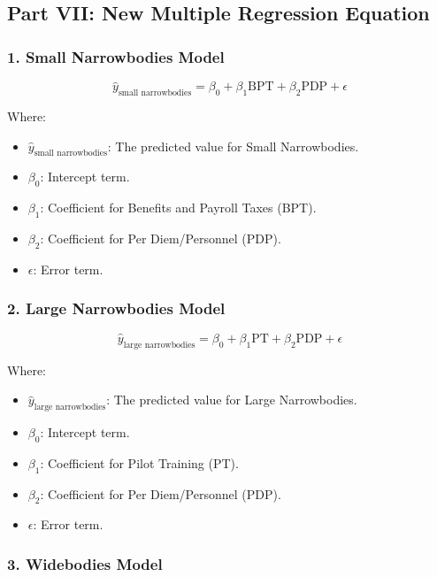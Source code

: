 \subsection{Part VII: New Multiple Regression Equation}
\subsubsection*{1. Small Narrowbodies Model}

\begin{equation}
    \hat{y}_{\text{small narrowbodies}} = \beta_0 + \beta_1 \text{BPT} + \beta_2 \text{PDP} + \epsilon
\end{equation}

Where:
\begin{itemize}
    \item \(\hat{y}_{\text{small narrowbodies}}\): The predicted value for Small Narrowbodies.
    \item \(\beta_0\): Intercept term.
    \item \(\beta_1\): Coefficient for Benefits and Payroll Taxes (BPT).
    \item \(\beta_2\): Coefficient for Per Diem/Personnel (PDP).
    \item \(\epsilon\): Error term.
\end{itemize}

\subsubsection{2. Large Narrowbodies Model}



\begin{equation}
    \hat{y}_{\text{large narrowbodies}} = \beta_0 + \beta_1 \text{PT} + \beta_2 \text{PDP} + \epsilon
\end{equation}

Where:
\begin{itemize}
    \item \(\hat{y}_{\text{large narrowbodies}}\): The predicted value for Large Narrowbodies.
    \item \(\beta_0\): Intercept term.
    \item \(\beta_1\): Coefficient for Pilot Training (PT).
    \item \(\beta_2\): Coefficient for Per Diem/Personnel (PDP).
    \item \(\epsilon\): Error term.
\end{itemize}

\subsubsection{3. Widebodies Model}


